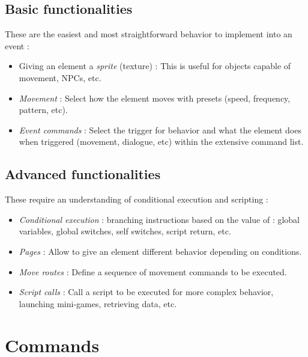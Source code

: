 \documentclass[11pt]{article}
\begin{document}
\subsection{Basic functionalities}

These are the easiest and most straightforward behavior to implement into an event :

\begin{itemize}
	\item Giving an element a \textit{sprite} (texture) : This is useful for objects capable of movement, NPCs, etc.
	
	\item \textit{Movement} : Select how the element moves with presets (speed, frequency, pattern, etc).
	
	\item \textit{Event commands} : Select the trigger for behavior and what the element does when triggered (movement, dialogue, etc) within the extensive command list.
\end{itemize}

\subsection{Advanced functionalities}

These require an understanding of conditional execution and scripting :

\begin{itemize}
	\item \textit{Conditional execution} : branching instructions based on the value of : global variables, global switches, self switches, script return, etc.
	
	\item \textit{Pages} : Allow to give an element different behavior depending on conditions.
	
	\item \textit{Move routes} : Define a sequence of movement commands to be executed.
	
	\item \textit{Script calls} : Call a script to be executed for more complex behavior, launching mini-games, retrieving data, etc.
\end{itemize}



\newpage
\section{Commands}
\end{document}
